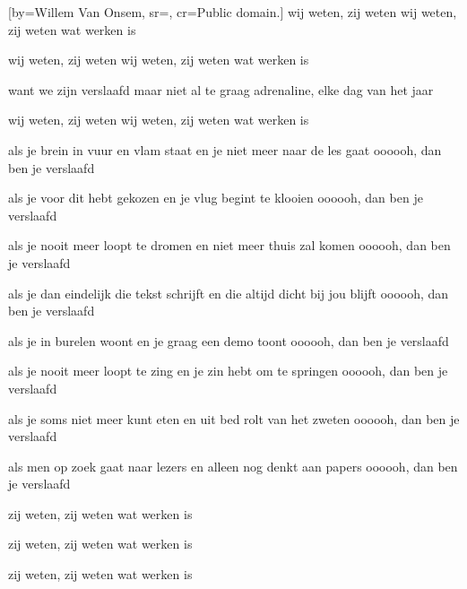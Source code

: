 [by={Willem Van Onsem},
sr={},
cr={Public domain.}]
\beginchorus
wij weten, zij weten
wij weten, zij weten
wat werken is

wij weten, zij weten
wij weten, zij weten
wat werken is

want we zijn verslaafd
maar niet al te graag
adrenaline, elke dag van het jaar

wij weten, zij weten
wij weten, zij weten
wat werken is
\endchorus

\beginverse
als je brein in vuur en vlam staat
en je niet meer naar de les gaat
oooooh, dan ben je verslaafd

als je voor dit hebt gekozen
en je vlug begint te klooien
oooooh, dan ben je verslaafd

als je nooit meer loopt te dromen
en niet meer thuis zal komen
oooooh, dan ben je verslaafd

als je dan eindelijk die tekst schrijft
en die altijd dicht bij jou blijft
oooooh, dan ben je verslaafd
\endverse

\beginverse
als je in burelen woont
en je graag een demo toont
oooooh, dan ben je verslaafd

als je nooit meer loopt te zing
en je zin hebt om te springen
oooooh, dan ben je verslaafd

als je soms niet meer kunt eten
en uit bed rolt van het zweten
oooooh, dan ben je verslaafd

als men op zoek gaat naar lezers
en alleen nog denkt aan papers
oooooh, dan ben je verslaafd
\endverse

\beginverse
zij weten, zij weten
wat werken is

zij weten, zij weten
wat werken is

zij weten, zij weten
wat werken is
\endverse

\endsong